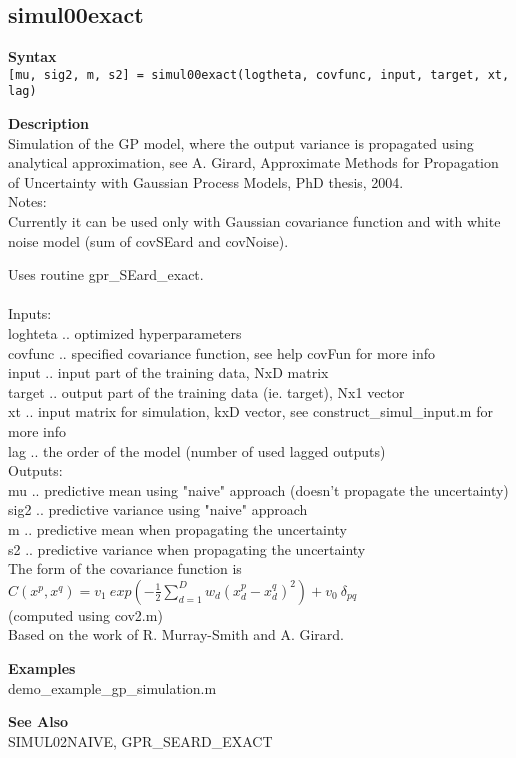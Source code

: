 \subsection*{simul00exact} \label{fun:simul00exact}

\textbf{Syntax}
\\  \texttt{[mu, sig2, m, s2] = simul00exact(logtheta, covfunc, input, target, xt, lag)}

\textbf{ Description}
\\ Simulation of the GP model, where the output variance is propagated using
 analytical approximation, see A. Girard, Approximate Methods for
Propagation of  Uncertainty with Gaussian Process Models, PhD
thesis, 2004.
\\ Notes:
\\ Currently it can be used only with Gaussian covariance function and
 with white noise model (sum of covSEard and covNoise).

 Uses routine gpr\_SEard\_exact.
\\
\\ Inputs:
\\ loghteta .. optimized hyperparameters
\\ covfunc .. specified covariance function, see help covFun for more info
\\ input .. input part of the training data,  NxD matrix
\\ target .. output part of the training data (ie. target), Nx1 vector
\\ xt .. input matrix for simulation, kxD vector, see
   construct\_simul\_input.m for more info
\\ lag .. the order of the model (number of used lagged outputs)
\\ Outputs:
\\ mu ..       predictive mean using "naive" approach (doesn't propagate the
           uncertainty)
\\ sig2 ..     predictive variance using "naive" approach
\\ m  ..       predictive mean when propagating the uncertainty
\\ s2 ..       predictive variance when propagating the uncertainty
\\ The form of the covariance function is\\
    $C(x^p,x^q) = v_1 \ exp \left( -\frac{1}{2} \sum_{d=1}^D w_d (x^p_d -
x^q_d)^2 \right) + v_0 \ \delta_{pq}$
\\  (computed using cov2.m)
\\ Based on the work of R. Murray-Smith and A. Girard.

\textbf{Examples}
\\ demo\_example\_gp\_simulation.m

\textbf{See Also}
\\ SIMUL02NAIVE, GPR\_SEARD\_EXACT
